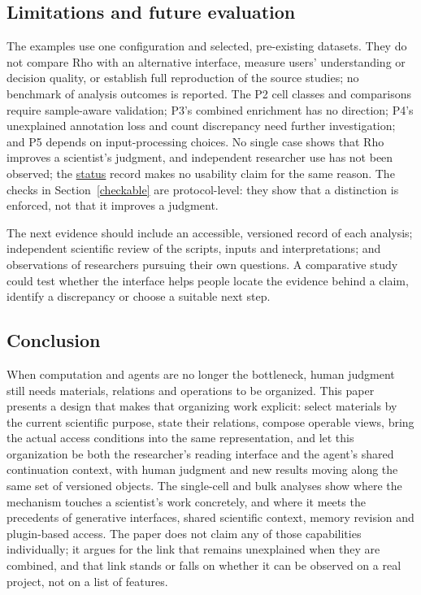 \documentclass[11pt]{article}
\begin{document}
\subsection{Limitations and future evaluation}\label{limitations}

The examples use one configuration and selected, pre-existing datasets. They do not compare Rho with an alternative interface, measure users' understanding or decision quality, or establish full reproduction of the source studies; no benchmark of analysis outcomes is reported. The P2 cell classes and comparisons require sample-aware validation; P3's combined enrichment has no direction; P4's unexplained annotation loss and count discrepancy need further investigation; and P5 depends on input-processing choices. No single case shows that Rho improves a scientist's judgment, and independent researcher use has not been observed; the \href{https://github.com/YuLab-SMU/Rho/blob/main/docs/STATUS.md}{status} record makes no usability claim for the same reason. The checks in Section~\ref{checkable} are protocol-level: they show that a distinction is enforced, not that it improves a judgment.

The next evidence should include an accessible, versioned record of each analysis; independent scientific review of the scripts, inputs and interpretations; and observations of researchers pursuing their own questions. A comparative study could test whether the interface helps people locate the evidence behind a claim, identify a discrepancy or choose a suitable next step.

\subsection{Conclusion}\label{conclusion}

When computation and agents are no longer the bottleneck, human judgment still needs materials, relations and operations to be organized. This paper presents a design that makes that organizing work explicit: select materials by the current scientific purpose, state their relations, compose operable views, bring the actual access conditions into the same representation, and let this organization be both the researcher's reading interface and the agent's shared continuation context, with human judgment and new results moving along the same set of versioned objects. The single-cell and bulk analyses show where the mechanism touches a scientist's work concretely, and where it meets the precedents of generative interfaces, shared scientific context, memory revision and plugin-based access. The paper does not claim any of those capabilities individually; it argues for the link that remains unexplained when they are combined, and that link stands or falls on whether it can be observed on a real project, not on a list of features.
\end{document}
